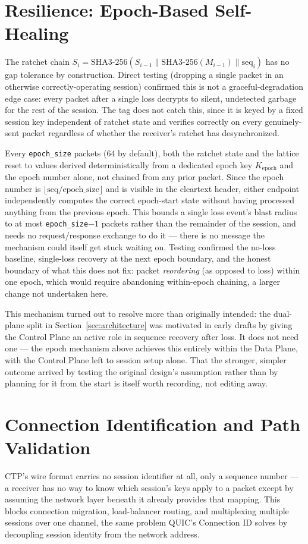 \documentclass[twocolumn,10pt,journal,compsoc]{IEEEtran}
\begin{document}
\section{Resilience: Epoch-Based Self-Healing}
\label{sec:resilience}
The ratchet chain $S_i = \text{SHA3-256}(S_{i-1} \| \text{SHA3-256}(M_{i-1}) \| \text{seq}_i)$ has no gap tolerance by construction. Direct testing (dropping a single packet in an otherwise correctly-operating session) confirmed this is not a graceful-degradation edge case: every packet after a single loss decrypts to silent, undetected garbage for the rest of the session. The tag does not catch this, since it is keyed by a fixed session key independent of ratchet state and verifies correctly on every genuinely-sent packet regardless of whether the receiver's ratchet has desynchronized.

Every \texttt{epoch\_size} packets (64 by default), both the ratchet state and the lattice reset to values derived deterministically from a dedicated epoch key $K_{\text{epoch}}$ and the epoch number alone, not chained from any prior packet. Since the epoch number is $\lfloor \text{seq}/\text{epoch\_size} \rfloor$ and  is visible in the cleartext header, either endpoint independently computes the correct epoch-start state without having processed anything from the previous epoch. This bounds a single loss event's blast radius to at most \texttt{epoch\_size}$-1$ packets rather than the remainder of the session, and needs no request/response exchange to do it --- there is no message the mechanism could itself get stuck waiting on. Testing confirmed the no-loss baseline, single-loss recovery at the next epoch boundary, and the honest boundary of what this does not fix: packet \emph{reordering} (as opposed to loss) within one epoch, which would require abandoning within-epoch chaining, a larger change not undertaken here.

This mechanism turned out to resolve more than originally intended: the dual-plane split in Section~\ref{sec:architecture} was motivated in early drafts by giving the Control Plane an active role in sequence recovery after loss. It does not need one --- the epoch mechanism above achieves this entirely within the Data Plane, with the Control Plane left to session setup alone. That the stronger, simpler outcome arrived by testing the original design's assumption rather than by planning for it from the start is itself worth recording, not editing away.

\section{Connection Identification and Path Validation}
\label{sec:cid}
CTP's wire format carries no session identifier at all, only a sequence number --- a receiver has no way to know which session's keys apply to a packet except by assuming the network layer beneath it already provides that mapping. This blocks connection migration, load-balancer routing, and multiplexing multiple sessions over one channel, the same problem QUIC's Connection ID solves by decoupling session identity from the network address.
\end{document}

